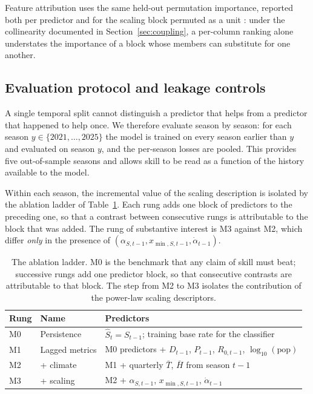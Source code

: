 \documentclass[english,10pt,b5paper]{article}
\begin{document}
Feature attribution uses the same held-out permutation importance, reported both
per predictor and for the scaling block permuted as a unit
\citep{breiman2001random}: under the collinearity documented in
Section~\ref{sec:coupling}, a per-column ranking alone understates the importance
of a block whose members can substitute for one another.

\subsection{Evaluation protocol and leakage controls}
\label{sec:ablation}

A single temporal split cannot distinguish a predictor that helps from a
predictor that happened to help once. We therefore evaluate season by season:
for each season $y \in \{2021, \dots, 2025\}$ the model is trained on every
season earlier than $y$ and evaluated on season $y$, and the per-season losses
are pooled. This provides five out-of-sample seasons and allows
skill to be read as a function of the history available to the model.

Within each season, the incremental value of the scaling description is isolated
by the ablation ladder of Table~\ref{tab:ladder}. Each rung adds one block of
predictors to the preceding one, so that a contrast between consecutive rungs is
attributable to the block that was added. The rung of substantive interest is
M3 against M2, which differ \emph{only} in the presence of
$(\alpha_{S,t-1}, x_{\min,S,t-1}, \dot\alpha_{t-1})$.

\begin{table}[htbp]
\centering
\small
\setlength{\tabcolsep}{5pt}
\caption{The ablation ladder. M0 is the benchmark that any claim of skill must
beat; successive rungs add one predictor block, so that consecutive contrasts are
attributable to that block. The step from M2 to M3 isolates the contribution of
the power-law scaling descriptors.}
\label{tab:ladder}
\begin{tabular}{@{}llp{7.2cm}@{}}
\toprule
Rung & Name & Predictors\\
\midrule
M0 & Persistence       & $\hat S_t=S_{t-1}$; training base rate for the classifier\\
M1 & Lagged metrics   & M0 predictors + $D_{t-1}$, $P_{t-1}$, $R_{0,t-1}$, $\log_{10}(\text{pop})$\\
M2 & \quad + climate   & M1 + quarterly $\bar T$, $\bar H$ from season $t-1$\\
M3 & \quad + scaling   & M2 + $\alpha_{S,t-1}$, $x_{\min,S,t-1}$, $\dot\alpha_{t-1}$\\
\bottomrule
\end{tabular}
\end{table}
\end{document}

